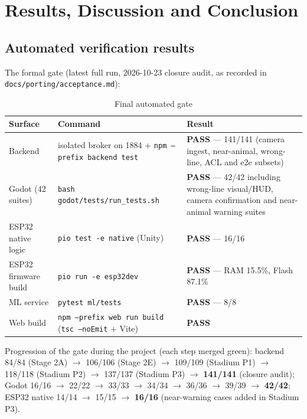 \chapter{Results, Discussion and Conclusion}\label{cha:results}

\section{Automated verification results}

The formal gate (latest full run, 2026-10-23 closure audit, as recorded in
\texttt{docs/porting/acceptance.md}):

\begin{longtable}{>{\raggedright}p{4.2cm} >{\raggedright\arraybackslash}p{7.2cm} >{\raggedright\arraybackslash}p{3.2cm}}
\caption{Final automated gate}\label{tab:finalgate}\\
\toprule
\textbf{Surface} & \textbf{Command} & \textbf{Result} \\
\midrule
Backend & isolated broker on 1884 +
\texttt{npm --prefix backend test} & \textbf{PASS}
--- 141/141 (camera ingest, near-animal, wrong-line, ACL and e2e
subsets) \\
Godot (42 suites) & \texttt{bash godot/tests/run\_tests.sh} & \textbf{PASS}
--- 42/42 including wrong-line visual/HUD, camera confirmation and
near-animal warning suites \\
ESP32 native logic & \texttt{pio test -e native} (Unity) & \textbf{PASS}
--- 16/16 \\
ESP32 firmware build & \texttt{pio run -e esp32dev} & \textbf{PASS}
--- RAM 15.5\%, Flash 87.1\% \\
ML service & \texttt{pytest ml/tests} & \textbf{PASS} --- 8/8 \\
Web build & \texttt{npm --prefix web run build} (\texttt{tsc --noEmit} +
Vite) & \textbf{PASS} \\
\bottomrule
\end{longtable}

\noindent Progression of the gate during the project (each step merged
green): backend 84/84 (Stage 2A) $\rightarrow$ 106/106 (Stage 2E) $\rightarrow$
109/109 (Stadium P1) $\rightarrow$ 118/118 (Stadium P2) $\rightarrow$
137/137 (Stadium P3) $\rightarrow$ \textbf{141/141} (closure audit); Godot
16/16 $\rightarrow$ 22/22 $\rightarrow$ 33/33 $\rightarrow$ 34/34 $\rightarrow$
36/36 $\rightarrow$ 39/39 $\rightarrow$ \textbf{42/42}; ESP32 native
14/14 $\rightarrow$ 15/15 $\rightarrow$ \textbf{16/16} (near-warning cases
added in Stadium P3).

